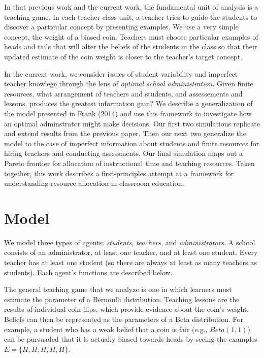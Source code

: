 \documentclass[man]{apa6}
\begin{document}
In that previous work and the current work, the fundamental unit of
analysis is a teaching game. In each teacher-class unit, a teacher tries
to guide the students to discover a particular concept by presenting
examples. We use a very simple concept, the weight of a biased coin.
Teachers must choose particular examples of heads and tails that will
alter the beliefs of the students in the class so that their updated
estimate of the coin weight is closer to the teacher's target concept.

In the current work, we consider issues of student variability and
imperfect teacher knowlege through the lens of \emph{optimal school
administration}. Given finite resources, what arrangement of teachers
and students, and assessements and lessons, produces the greatest
information gain? We describe a generalization of the model presented in
Frank (2014) and use this framework to investigate how an optimal
adminstrator might make decisions. Our first two simulations replicate
and extend results from the previous paper. Then our next two generalize
the model to the case of imperfect information about students and finite
resources for hiring teachers and conducting assessments. Our final
simulation maps out a Pareto frontier for allocation of instructional
time and teaching resources. Taken together, this work describes a
first-principles attempt at a framework for understanding resource
allocation in classroom education.

\section{Model}\label{model}

We model three types of agents: \emph{students}, \emph{teachers}, and
\emph{administrators}. A school consists of an administrator, at least
one teacher, and at least one student. Every teacher has at least one
student (so there are always at least as many teachers as students).
Each agent's functions are described below.

The general teaching game that we analyze is one in which learners must
estimate the parameter of a Bernoulli distribution. Teaching lessons are
the results of individual coin flips, which provide evidence about the
coin's weight. Beliefs can then be represented as the parameters of a
Beta distribution. For example, a student who has a weak belief that a
coin is fair (e.g., \(Beta(1,1)\)) can be pursuaded that it is actually
biased towards heads by seeing the examples \(E = \{H, H, H, H, H\}\).
\end{document}
